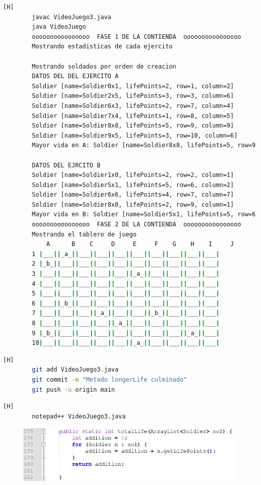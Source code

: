 \documentclass{article}
\begin{document}
	
	\begin{lstlisting}[language=bash,caption={Compilando y probando }][H]
		javac VideoJuego3.java
		java VideoJuego
		oooooooooooooooo  FASE 1 DE LA CONTIENDA  oooooooooooooooo
		Mostrando estadisticas de cada ejercito
		
		Mostrando soldados por orden de creacion
		DATOS DEL DEL EJERCITO A
		Soldier [name=Soldier0x1, lifePoints=2, row=1, column=2]
		Soldier [name=Soldier2x5, lifePoints=3, row=3, column=6]
		Soldier [name=Soldier6x3, lifePoints=2, row=7, column=4]
		Soldier [name=Soldier7x4, lifePoints=1, row=8, column=5]
		Soldier [name=Soldier8x8, lifePoints=5, row=9, column=9]
		Soldier [name=Soldier9x5, lifePoints=3, row=10, column=6]
		Mayor vida en A: Soldier [name=Soldier8x8, lifePoints=5, row=9, column=9]
		
		DATOS DEL EJRCITO B
		Soldier [name=Soldier1x0, lifePoints=2, row=2, column=1]
		Soldier [name=Soldier5x1, lifePoints=5, row=6, column=2]
		Soldier [name=Soldier6x6, lifePoints=4, row=7, column=7]
		Soldier [name=Soldier8x0, lifePoints=2, row=9, column=1]
		Mayor vida en B: Soldier [name=Soldier5x1, lifePoints=5, row=6, column=2]
		oooooooooooooooo  FASE 2 DE LA CONTIENDA  oooooooooooooooo
		Mostrando el tablero de juego
			A      B    C     D     E     F    G    H    I     J
		1 |___||_a_||___||___||___||___||___||___||___||___|
		2 |_b_||___||___||___||___||___||___||___||___||___|
		3 |___||___||___||___||___||_a_||___||___||___||___|
		4 |___||___||___||___||___||___||___||___||___||___|
		5 |___||___||___||___||___||___||___||___||___||___|
		6 |___||_b_||___||___||___||___||___||___||___||___|
		7 |___||___||___||_a_||___||___||_b_||___||___||___|
		8 |___||___||___||___||_a_||___||___||___||___||___|
		9 |_b_||___||___||___||___||___||___||___||_a_||___|
		10|___||___||___||___||___||_a_||___||___||___||___|
	\end{lstlisting}
	
	\begin{lstlisting}[language=bash,caption={Commit: Metodo longerLife culminado B}][H]
		git add VideoJuego3.java
		git commit -m "Metodo longerLife culminado"			
		git push -u origin main
	\end{lstlisting}
	
	
	\begin{lstlisting}[language=bash,caption={Se implementa el método que retorna la vida total del ejército}][H]
		notepad++ VideoJuego3.java
	\end{lstlisting}
	
	\begin{figure}[H]
		\centering
		\includegraphics[width=1\textwidth,keepaspectratio]{img/7.jpg}
	\end{figure}
	
\end{document}
